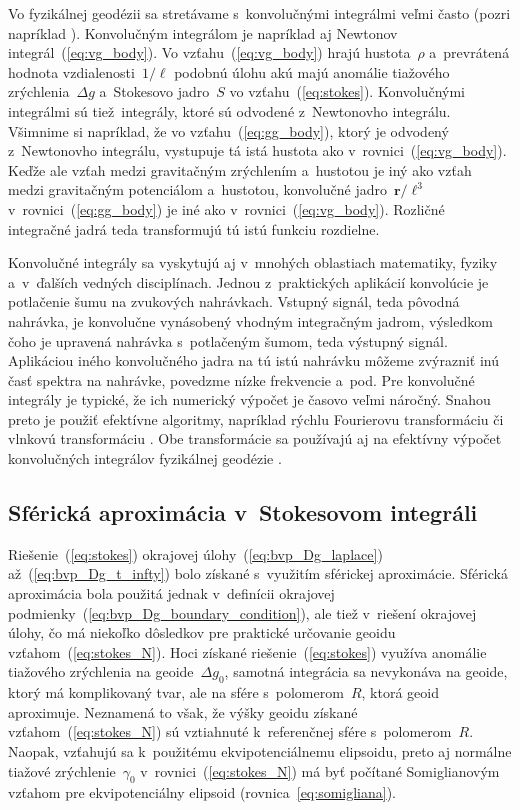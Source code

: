\documentclass[a4paper, 12pt]{book}
\let\vec\mathbf
\begin{document}
Vo fyzikálnej geodézii sa stretávame s~konvolučnými integrálmi veľmi často 
(pozri napríklad \cite{Jekeli2017}).  Konvolučným integrálom je napríklad aj 
Newtonov integrál~(\ref{eq:vg_body}).  Vo vzťahu~(\ref{eq:vg_body}) hrajú 
hustota~$\rho$ a~prevrátená hodnota vzdialenosti~$1 \slash \ell$ podobnú úlohu 
akú majú anomálie tiažového zrýchlenia~$\Delta g$ a~Stokesovo jadro~$S$ vo 
vzťahu~(\ref{eq:stokes}). Konvolučnými integrálmi sú tiež~integrály, ktoré sú 
odvodené z~Newtonovho integrálu.  Všimnime si napríklad, že vo 
vzťahu~(\ref{eq:gg_body}), ktorý je odvodený z~Newtonovho integrálu, vystupuje 
tá istá hustota ako v~rovnici~(\ref{eq:vg_body}).  Keďže ale vzťah medzi 
gravitačným zrýchlením a~hustotou je iný ako vzťah medzi gravitačným 
potenciálom a~hustotou, konvolučné jadro~$\vec r \slash \ell^3$ 
v~rovnici~(\ref{eq:gg_body}) je iné ako v~rovnici~(\ref{eq:vg_body}).  Rozličné 
integračné jadrá teda transformujú tú istú funkciu rozdielne.

Konvolučné integrály sa vyskytujú aj v~mnohých oblastiach matematiky, fyziky 
a~v~ďalších vedných disciplínach.  Jednou z~praktických aplikácií konvolúcie je 
potlačenie šumu na zvukových nahrávkach.  Vstupný signál, teda pôvodná 
nahrávka, je konvolučne vynásobený vhodným integračným jadrom, výsledkom čoho 
je upravená nahrávka s~potlačeným šumom, teda výstupný signál.  Aplikáciou 
iného konvolučného jadra na tú istú nahrávku môžeme zvýrazniť inú časť spektra 
na nahrávke, povedzme nízke frekvencie a~pod.  Pre konvolučné integrály je 
typické, že ich numerický výpočet je časovo veľmi náročný.  Snahou preto je 
použiť efektívne algoritmy, napríklad rýchlu Fourierovu transformáciu 
\parencite{PressNumericalRecipes} či vlnkovú transformáciu 
\parencite{KellerWavelets}.  Obe transformácie sa používajú aj na efektívny 
výpočet konvolučných integrálov fyzikálnej geodézie \parencite[pozri 
napríklad][]{Forsberg1984,Freeden1998a,SansoGeoidDetermination}.


\subsection{Sférická aproximácia v~Stokesovom integráli}
\label{sec:stokes_spherical_approximation}

Riešenie~(\ref{eq:stokes}) okrajovej úlohy~(\ref{eq:bvp_Dg_laplace}) 
až~(\ref{eq:bvp_Dg_t_infty}) bolo získané s~využitím sférickej aproximácie.  
Sférická aproximácia bola použitá jednak v~definícii okrajovej 
podmienky~(\ref{eq:bvp_Dg_boundary_condition}), ale tiež v~riešení okrajovej 
úlohy, čo má niekoľko dôsledkov pre praktické určovanie geoidu 
vzťahom~(\ref{eq:stokes_N}).  Hoci získané riešenie~(\ref{eq:stokes}) využíva 
anomálie tiažového zrýchlenia na geoide~$\Delta g_0$, samotná integrácia sa 
nevykonáva na geoide, ktorý má komplikovaný tvar, ale na sfére s~polomerom~$R$, 
ktorá geoid aproximuje.  Neznamená to však, že výšky geoidu získané 
vzťahom~(\ref{eq:stokes_N}) sú vztiahnuté k~referenčnej sfére s~polomerom~$R$.  
Naopak, vzťahujú sa k~použitému ekvipotenciálnemu elipsoidu, preto aj normálne 
tiažové zrýchlenie~$\gamma_0$ v~rovnici~(\ref{eq:stokes_N}) má byť počítané 
Somiglianovým vzťahom pre ekvipotenciálny elipsoid 
(rovnica~\ref{eq:somigliana}).
\end{document}
